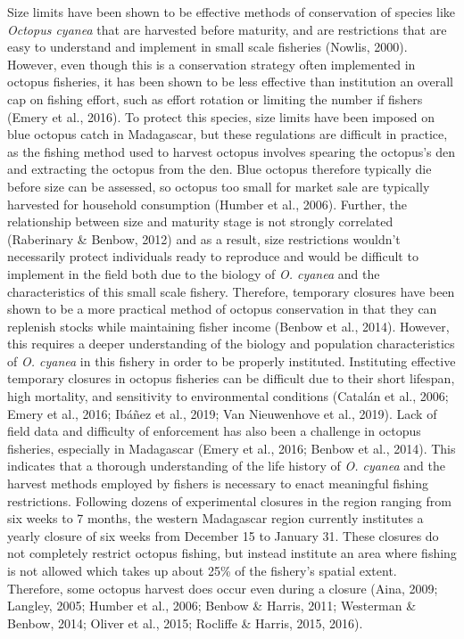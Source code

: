 \documentclass[
]{article}
\begin{document}
Size limits have been shown to be effective methods of conservation of species like \emph{Octopus cyanea} that are harvested before maturity, and are restrictions that are easy to understand and implement in small scale fisheries (Nowlis, 2000). However, even though this is a conservation strategy often implemented in octopus fisheries, it has been shown to be less effective than institution an overall cap on fishing effort, such as effort rotation or limiting the number if fishers (Emery et al., 2016). To protect this species, size limits have been imposed on blue octopus catch in Madagascar, but these regulations are difficult in practice, as the fishing method used to harvest octopus involves spearing the octopus's den and extracting the octopus from the den. Blue octopus therefore typically die before size can be assessed, so octopus too small for market sale are typically harvested for household consumption (Humber et al., 2006). Further, the relationship between size and maturity stage is not strongly correlated (Raberinary \& Benbow, 2012) and as a result, size restrictions wouldn't necessarily protect individuals ready to reproduce and would be difficult to implement in the field both due to the biology of \emph{O. cyanea} and the characteristics of this small scale fishery. Therefore, temporary closures have been shown to be a more practical method of octopus conservation in that they can replenish stocks while maintaining fisher income (Benbow et al., 2014). However, this requires a deeper understanding of the biology and population characteristics of \emph{O. cyanea} in this fishery in order to be properly instituted. Instituting effective temporary closures in octopus fisheries can be difficult due to their short lifespan, high mortality, and sensitivity to environmental conditions (Catalán et al., 2006; Emery et al., 2016; Ibáñez et al., 2019; Van Nieuwenhove et al., 2019). Lack of field data and difficulty of enforcement has also been a challenge in octopus fisheries, especially in Madagascar (Emery et al., 2016; Benbow et al., 2014). This indicates that a thorough understanding of the life history of \emph{O. cyanea} and the harvest methods employed by fishers is necessary to enact meaningful fishing restrictions. Following dozens of experimental closures in the region ranging from six weeks to 7 months, the western Madagascar region currently institutes a yearly closure of six weeks from December 15 to January 31. These closures do not completely restrict octopus fishing, but instead institute an area where fishing is not allowed which takes up about 25\% of the fishery's spatial extent. Therefore, some octopus harvest does occur even during a closure (Aina, 2009; Langley, 2005; Humber et al., 2006; Benbow \& Harris, 2011; Westerman \& Benbow, 2014; Oliver et al., 2015; Rocliffe \& Harris, 2015, 2016).
\end{document}
